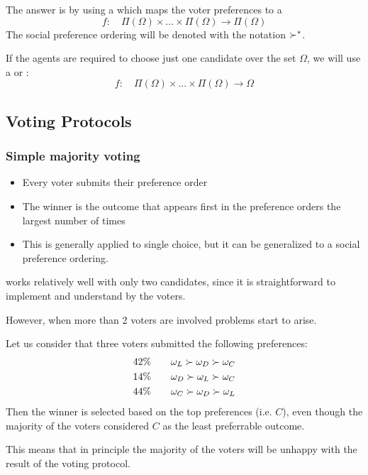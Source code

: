  The answer is by using a  which maps the voter preferences to a \\
 \[f:\quad \Pi(\Omega) \times ...\times\Pi(\Omega) \rightarrow \Pi(\Omega)\]
 The social preference ordering will be denoted with the notation $\succ^*$.
 
 If the agents are required to choose just one candidate over the set $\Omega$, we will use a  or :
 \[f:\quad \Pi(\Omega) \times ...\times\Pi(\Omega) \rightarrow \Omega\]

\subsection{Voting Protocols}
\subsubsection{Simple majority voting}
\begin{itemize}
\item Every voter submits their preference order
\item The winner is the outcome that appears first in the preference orders the largest number of times
\item This is generally applied to single choice, but it can be generalized to a social preference ordering.
\end{itemize}
\phantom{c} works relatively well with only two candidates, since it is straightforward to implement and understand by the voters.

However, when more than 2 voters are involved problems start to arise.

Let us consider that three voters submitted the following preferences:
\begin{align*}
42\%\qquad& \omega_L \succ \omega_D \succ \omega_C\\
14\%\qquad& \omega_D \succ \omega_L \succ \omega_C\\
44\%\qquad& \omega_C \succ \omega_D \succ \omega_L\\
\end{align*}
Then the winner is selected based on the top preferences (i.e. $C$), even though the majority of the voters considered $C$ as the least preferrable outcome.

This means that in principle the majority of the voters will be unhappy with the result of the voting protocol.


